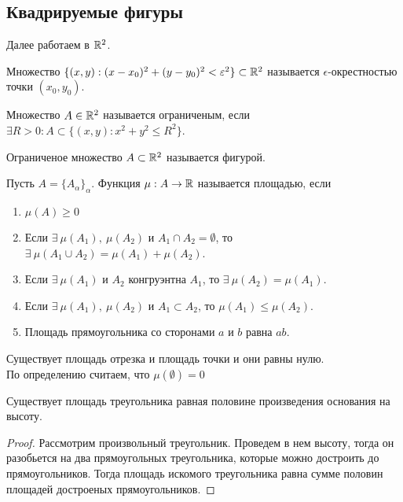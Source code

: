 \subsection{Квадрируемые фигуры}
Далее работаем в $\mathbb{R}^2$.
\begin{definition}
    Множество $\{(x,y): (x-x_0)^2+(y-y_0)^2<\varepsilon^2\}\subset \mathbb{R}^2$ называется $\epsilon$-окрестностью точки $(x_0,y_0)$.
\end{definition}
\begin{definition}
    Множество $A\in \mathbb{R}^2$ называется ограниченым, если $\exists R>0: A\subset \{(x,y): x^2+y^2\leq R^2\}$.
\end{definition}  
\begin{definition}
    Ограниченое множество $A\subset \mathbb{R}^2$ называется фигурой.
\end{definition} 
\begin{definition}
    Пусть $A=\{A_{\alpha}\}_{\alpha}$. Функция $\mu: A\to \mathbb{R}$ называется площадью, если 
    \begin{enumerate}
        \item $\mu(A)\geq 0$
        \item Если $\exists\ \mu(A_1),\ \mu(A_2)$ и $A_1\cap A_2 =\emptyset$, то $\exists\ \mu(A_1 \cup A_2)=\mu(A_1)+\mu(A_2)$.
        \item Если $\exists\ \mu(A_1)$ и $A_2$ конгруэнтна $A_1$, то $\exists\ \mu(A_2)=\mu(A_1)$.
        \item Если $\exists\ \mu(A_1),\ \mu(A_2)$ и $A_1\subset A_2$, то $\mu(A_1)\leq \mu(A_2)$.
        \item Площадь прямоугольника со сторонами $a$ и $b$ равна $ab$.
    \end{enumerate}
\end{definition} 
\begin{comm}
    Существует площадь отрезка и площадь точки и они равны нулю.\\
    По определению считаем, что $\mu(\emptyset)=0$
\end{comm} 
\begin{statement}
    Существует площадь треугольника равная половине произведения основания на высоту.
\end{statement} 
\begin{proof}
    Рассмотрим произвольный треугольник. Проведем в нем высоту, тогда он разобьется на два прямоугольных треугольника, которые можно достроить до прямоугольников. Тогда площадь искомого треугольника равна сумме половин площадей достроеных прямоугольников. 
\end{proof} 

